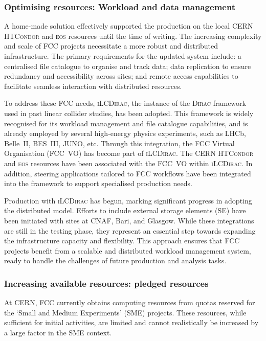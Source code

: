\subsubsection{Optimising resources: Workload and data management}

A home-made solution effectively supported the production on the local CERN \textsc{HTCondor} and \textsc{eos} resources until the time of writing. 
The increasing complexity and scale of FCC projects necessitate a more robust and distributed infrastructure.
The primary requirements for the updated system include: 
a centralised file catalogue to organise and track data;
data replication to ensure redundancy and accessibility across sites; 
and remote access capabilities to facilitate seamless interaction with distributed resources.

To address these FCC needs, \textsc{iLCDirac}, the instance of the \textsc{Dirac} framework used in past linear collider studies, has been adopted. 
This framework is widely recognised for its workload management and file catalogue capabilities, and is already employed by several high-energy physics experiments, such as LHCb, Belle~II, BES~III, JUNO, etc. 
Through this integration, the FCC Virtual Organisation (FCC~VO) has become part of \textsc{iLCDirac}.
The CERN \textsc{HTCondor} and \textsc{eos} resources have been associated with the FCC~VO within \textsc{iLCDirac}. 
In addition, steering applications tailored to FCC workflows have been integrated into the framework 
to support specialised production needs.

Production with \textsc{iLCDirac} has begun, marking significant progress in adopting the distributed model. 
Efforts to include external storage elements (SE) have been initiated with sites at CNAF, Bari, and Glasgow. 
While these integrations are still in the testing phase, 
they represent an essential step towards expanding the infrastructure capacity and flexibility.
This approach ensures that FCC projects benefit from a scalable and distributed workload management system, 
ready to handle the challenges of future production and analysis tasks.

\subsubsection{Increasing available resources: pledged resources}

At CERN, FCC currently obtains computing resources from quotas reserved for the `Small and Medium Experiments' (SME) projects. 
These resources, while sufficient for initial activities, are limited and cannot realistically be increased by a large factor in the SME context. 

